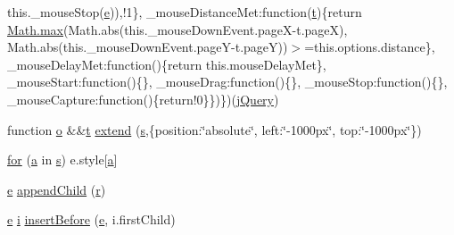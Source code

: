 \begin{DoxyCompactItemize}
this.\+\_\+mouse\+Stop(\hyperlink{jquery-ui_8min_8js_abea95a4e94bc6f4151d5683d4c12c3f4}{e})),!1\}, \+\_\+mouse\+Distance\+Met\+:function(\hyperlink{jquery-ui_8min_8js_acf335ef347969ef6dc8387e680fb289e}{t})\{return \hyperlink{_chart_8_core_8js_a04fa2ea575d5471ca09e1b344ec4a69e}{Math.\+max}(Math.\+abs(this.\+\_\+mouse\+Down\+Event.\+pageX-\/t.\+pageX), Math.\+abs(this.\+\_\+mouse\+Down\+Event.\+pageY-\/t.\+pageY))$>$=this.\+options.\+distance\}, \+\_\+mouse\+Delay\+Met\+:function()\{return this.\+mouse\+Delay\+Met\}, \+\_\+mouse\+Start\+:function()\{\}, \+\_\+mouse\+Drag\+:function()\{\}, \+\_\+mouse\+Stop\+:function()\{\}, \+\_\+mouse\+Capture\+:function()\{return!0\}\})\})(\hyperlink{jquery_8tokeninput_8js_a2b1d6f9c448e3ce72f4e1865d6e38d2c}{j\+Query})
\item 
function \hyperlink{fullpage_2plugin_8min_8js_a4afc7c854f61c136d7bcfa8997651b88}{o} \&\&\hyperlink{jquery-ui_8min_8js_acf335ef347969ef6dc8387e680fb289e}{t} \hyperlink{jquery-ui_8min_8js_ac34b1e8d7ba15199ecd15b73001999a9}{extend} (\hyperlink{paste_2plugin_8min_8js_a43ae144ee2a4e493fea41ca42f795b14}{s},\{position\+:\char`\"{}absolute\char`\"{}, left\+:\char`\"{}-\/1000px\char`\"{}, top\+:\char`\"{}-\/1000px\char`\"{}\})
\item 
\hyperlink{jquery-ui_8min_8js_a75bc805cf26ad48d8e8a98f5af2c3e76}{for} (\hyperlink{_chart_8min_8js_aef3b685c08bc6c76c8e729bd0e93901d}{a} in \hyperlink{paste_2plugin_8min_8js_a43ae144ee2a4e493fea41ca42f795b14}{s}) e.\+style\mbox{[}\hyperlink{_chart_8min_8js_aef3b685c08bc6c76c8e729bd0e93901d}{a}\mbox{]}
\item 
\hyperlink{jquery-ui_8min_8js_abea95a4e94bc6f4151d5683d4c12c3f4}{e} \hyperlink{jquery-ui_8min_8js_adf92e33dcaf18325c9350e872fdf84ca}{append\+Child} (\hyperlink{jquery-1_811_81_8min_8js_a96f65b399314d93896076ceb474b6b9b}{r})
\item 
\hyperlink{jquery-ui_8min_8js_abea95a4e94bc6f4151d5683d4c12c3f4}{e} \hyperlink{jquery-ui_8min_8js_a83e0f8a79d7f496783fc7527db51773e}{i} \hyperlink{jquery-ui_8min_8js_a540cc4c4af88a9d96b5e78de0657219e}{insert\+Before} (\hyperlink{jquery-ui_8min_8js_abea95a4e94bc6f4151d5683d4c12c3f4}{e}, i.\+first\+Child)
\item 

\end{DoxyCompactItemize}
